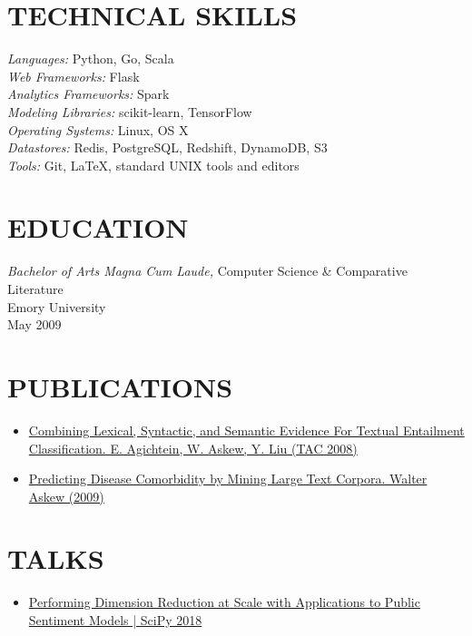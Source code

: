 \documentclass[line,margin]{res}
\begin{document}
\begin{resume}
\section{TECHNICAL SKILLS}
        {\sl Languages:} Python, Go, Scala \\
        {\sl Web Frameworks:} Flask \\
        {\sl Analytics Frameworks:} Spark \\
        {\sl Modeling Libraries:} scikit-learn, TensorFlow  \\
        {\sl Operating Systems:} Linux, OS X\\
        {\sl Datastores:} Redis, PostgreSQL, Redshift, DynamoDB, S3 \\
        {\sl Tools:} Git, \LaTeX, standard UNIX tools and editors

\section{EDUCATION}
        {\sl Bachelor of Arts Magna Cum Laude,}
        Computer Science \& Comparative Literature \\
        Emory University \\
        May 2009

\section{PUBLICATIONS}
\begin{itemize}
\item \href{http://www.nist.gov/tac/publications/2008/participant.papers/Emory.proceedings.pdf}{Combining Lexical, Syntactic, and Semantic Evidence For
  Textual Entailment Classification.  E. Agichtein, W. Askew, Y. Liu
  (TAC 2008)}
\item \href{https://etd.library.emory.edu/concern/etds/736664895}
  {Predicting Disease Comorbidity by Mining Large Text
    Corpora. Walter Askew (2009)}
\end{itemize}

\section{TALKS}
\begin{itemize}
  \item \href{https://www.youtube.com/watch?v=31YeSfDklfc}{Performing Dimension Reduction at Scale with Applications to Public Sentiment Models | SciPy 2018}
\end{itemize}

\end{resume}
\end{document}
